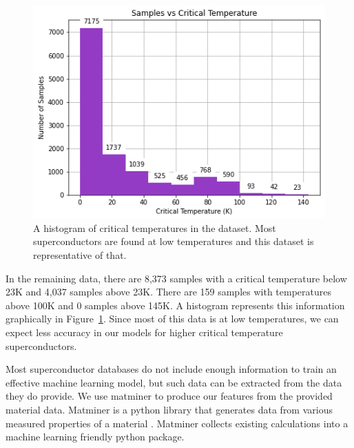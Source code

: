 \documentclass[twocolumn, nofootinbib, secnumarabic, amssymb, nobibnotes, aps, prd]{revtex4-2}
\begin{document}
\begin{figure}[!h]
   \centering %
   \includegraphics[width=\columnwidth]{images/dataset_histogram.png}
   \caption{A histogram of critical temperatures in the dataset. Most superconductors are found at low temperatures and this dataset is representative of that.} %
   \label{fig:data-histogram}
\end{figure} %

In the remaining data, there are 8,373 samples with a critical temperature below 23K and 4,037 samples above 23K. There are 159 samples with temperatures above 100K and 0 samples above 145K. A histogram represents this information graphically in Figure~\ref{fig:data-histogram}. Since most of this data is at low temperatures, we can expect less accuracy in our models for higher critical temperature superconductors.

Most superconductor databases do not include enough information to train an effective machine learning model, but such data can be extracted from the data they do provide. We use matminer to produce our features from the provided material data. Matminer is a python library that generates data from various measured properties of a material \cite{WARD201860}. Matminer collects existing calculations into a machine learning friendly python package. %

\end{document}
